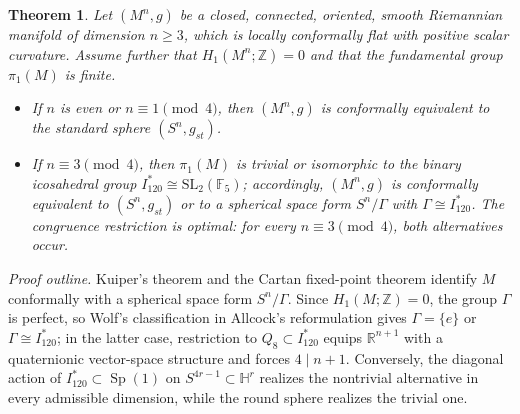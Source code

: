 \documentclass[12pt,oneside,a4paper]{article}
\theoremstyle{mytheorem}
\newtheorem{theorem}[definition]{Theorem}
\theoremstyle{remark}
\theoremstyle{definition}
\begin{document}
\begin{theorem}\label{nLCF}
Let \( (M^n, g) \) be a closed, connected, oriented, smooth Riemannian manifold of dimension \( n \geq 3 \), which is locally conformally flat with positive scalar curvature. Assume further that \( H_1(M^n; \mathbb{Z}) = 0 \) and that the fundamental group \( \pi_1(M) \) is finite.

\begin{itemize}
\item[(i)] If \(n\) is even or \(n\equiv1\pmod4\), then \((M^n,g)\) is conformally equivalent to the standard sphere \((S^n,g_{st})\).

\item[(ii)] If \(n\equiv3\pmod4\), then \(\pi_1(M)\) is trivial or isomorphic to the binary icosahedral group \(I_{120}^*\cong\mathrm{SL}_2(\mathbb F_5)\); accordingly, \((M^n,g)\) is conformally equivalent to \((S^n,g_{st})\) or to a spherical space form \(S^n/\Gamma\) with \(\Gamma\cong I_{120}^*\). The congruence restriction is optimal: for every \(n\equiv3\pmod4\), both alternatives occur.
\end{itemize}
\end{theorem}



\emph{Proof outline.}
Kuiper's theorem and the Cartan fixed-point theorem identify \(M\)
conformally with a spherical space form \(S^n/\Gamma\). Since
\(H_1(M;\mathbb Z)=0\), the group \(\Gamma\) is perfect, so
Wolf's classification in Allcock's reformulation gives \(\Gamma=\{e\}\) or
\(\Gamma\cong I_{120}^*\); in the latter case, restriction to
\(Q_8\subset I_{120}^*\) equips \(\mathbb R^{n+1}\) with a quaternionic
vector-space structure and forces \(4\mid n+1\). Conversely, the diagonal
action of \(I_{120}^*\subset\operatorname{Sp}(1)\) on
\(S^{4r-1}\subset\mathbb H^r\) realizes the nontrivial alternative in every
admissible dimension, while the round sphere realizes the trivial one.
\end{document}
